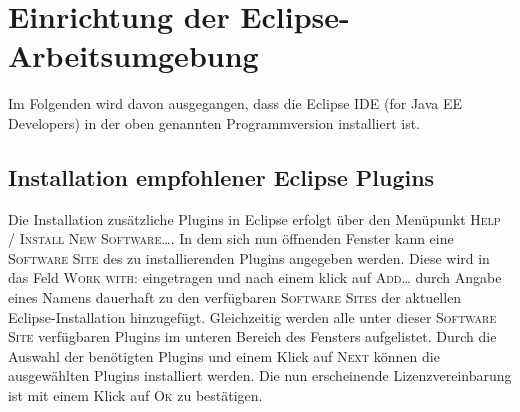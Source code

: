 \section{Einrichtung der Eclipse-Arbeitsumgebung}
Im Folgenden wird davon ausgegangen, dass die Eclipse IDE (for Java EE Developers) in der oben genannten Programmversion installiert ist.

\subsection{Installation empfohlener Eclipse Plugins}
Die Installation zusätzliche Plugins in Eclipse erfolgt über den Menüpunkt \textsc{Help / Install New Software\ldots}. In dem sich nun öffnenden Fenster kann eine \textsc{Software Site} des zu installierenden Plugins angegeben werden. Diese wird in das Feld \textsc{Work with:} eingetragen und nach einem klick auf \textsc{Add\ldots} durch Angabe eines Namens dauerhaft zu den verfügbaren \textsc{Software Sites} der aktuellen Eclipse-Installation hinzugefügt. Gleichzeitig werden alle unter dieser \textsc{Software Site} verfügbaren Plugins im unteren Bereich des Fensters aufgelistet. Durch die Auswahl der benötigten Plugins und einem Klick auf \textsc{Next} können die ausgewählten Plugins installiert werden. Die nun erscheinende Lizenzvereinbarung ist mit einem Klick auf \textsc{Ok} zu bestätigen.


